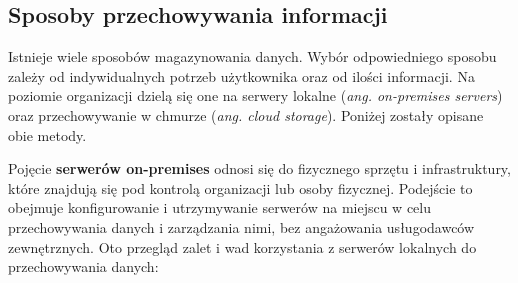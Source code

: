 \documentclass[12pt,a4paper,twoside]{article}
\begin{document}
\subsection{Sposoby przechowywania informacji}
Istnieje wiele sposobów magazynowania danych. Wybór odpowiedniego sposobu zależy od indywidualnych potrzeb użytkownika oraz od ilości informacji. Na poziomie organizacji dzielą się one na serwery lokalne (\textit{ang. on-premises servers}) oraz przechowywanie w chmurze (\textit{ang. cloud storage}). Poniżej zostały opisane obie metody.\par
Pojęcie \textbf{serwerów on-premises} odnosi się do fizycznego sprzętu i infrastruktury, które znajdują się pod kontrolą organizacji lub osoby fizycznej. Podejście to obejmuje konfigurowanie i utrzymywanie serwerów na miejscu w celu przechowywania danych i zarządzania nimi, bez angażowania usługodawców zewnętrznych. Oto przegląd zalet i wad korzystania z serwerów lokalnych do przechowywania danych:
\end{document}
